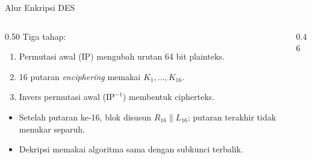 \documentclass[aspectratio=169,11pt]{beamer}
\begin{document}
\begin{frame}{Alur Enkripsi DES}
    \begin{columns}[T,onlytextwidth]
        \begin{column}{0.50\textwidth}
            \footnotesize
            Tiga tahap:
            \begin{enumerate}
                \item Permutasi awal (IP) mengubah urutan 64 bit
                      plainteks.
                \item 16 putaran \textit{enciphering} memakai
                      $K_1,\dots,K_{16}$.
                \item Invers permutasi awal ($\mathrm{IP}^{-1}$)
                      membentuk cipherteks.
            \end{enumerate}
            \begin{itemize}
                \item Setelah putaran ke-16, blok disusun
                      $R_{16}\parallel L_{16}$; putaran terakhir tidak
                      menukar separuh.
                \item Dekripsi memakai algoritma sama dengan subkunci
                      terbalik.
            \end{itemize}
        \end{column}
        \begin{column}{0.46\textwidth}
            \begin{center}
            \end{center}
        \end{column}
    \end{columns}
\end{frame}
\end{document}
